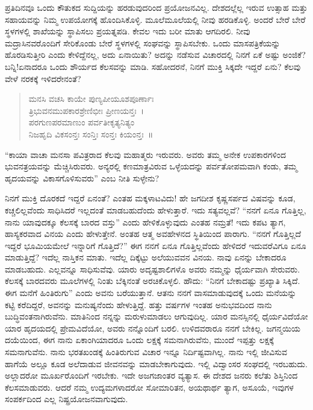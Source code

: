 ಪ್ರತಿದಿನವೂ ಒಂದು ಕೌತುಕದ ಸುದ್ದಿಯನ್ನು ಹರಡುವುದರಿಂದ ಪ್ರಯೋಜನವಿಲ್ಲ. ದೇಶದಲ್ಲೆಲ್ಲ ಇರುವ ಉತ್ಸಾಹ ಮತ್ತು ಸಹಾಯವನ್ನು ನಿಮ್ಮ ಉಪಯೋಗಕ್ಕೆ ಹೊಂದಿಸಿಕೊಳ್ಳಿ. ಮೂಲೆಮೂಲೆಯಲ್ಲಿ ನೀವು ಹರಡಿಕೊಳ್ಳಿ. ಅಂದರೆ ಬೇರೆ ಬೇರೆ ಸ್ಥಳಗಳಲ್ಲಿ ಶಾಖೆಯನ್ನು ಸ್ಥಾಪಿಸಲು ಪ್ರಯತ್ನಪಡಿ. ಕೇವಲ ಇದು ಬರೀ ಮಾತು ಆಗದಿರಲಿ. ನೀವು ಮದ್ರಾಸಿನವರೊಂದಿಗೆ ಸೇರಿಕೊಂಡು ಬೇರೆ ಸ್ಥಳಗಳಲ್ಲಿ ಸಂಘವನ್ನು ಸ್ಥಾಪಿಸಬೇಕು. ಒಂದು ಮಾಸಪತ್ರಿಕೆಯನ್ನು ಹೊರಡಿಸುತ್ತೀರಿ ಎಂದು ಕೇಳಿದ್ದೆನಲ್ಲ, ಅದು ಏನಾಯಿತು? ಅದನ್ನು ನಡೆಸುವ ವಿಚಾರದಲ್ಲಿ ನಿನಗೆ ಏಕೆ ಅಷ್ಟು ಅಂಜಿಕೆ? ಬನ್ನಿ!ಏನಾದರೂ ಒಂದು ಶೌರ್ಯದ ಕೆಲಸವನ್ನು ಮಾಡಿ. ಸಹೋದರನೆ, ನಿನಗೆ ಮುಕ್ತಿ ಸಿಕ್ಕದೇ ಇದ್ದರೆ ಏನು? ಕೆಲವು ವೇಳೆ ನರಕಕ್ಕೆ ಇಳಿದರೇನಂತೆ?
\begin{verse}
 ಮನಸಿ ವಚಸಿ ಕಾಯೇ ಪುಣ್ಯಪೀಯೂಶಪೂರ್ಣಾಃ\\
 ತ್ರಿಭುವನಮುಪಕಾರಶ್ರೇಣಿಭೀಃ ಪ್ರೀಣಯನ್ತಃ~।\\
 ಪರಗುಣಪರಮಾಣುಂ ಪರ್ವತೀಕೃತ್ಯನಿತ್ಯಂ\\
 ನಿಜಹೃದಿ ವಿಕಸಂನ್ತಃ ಸಂನ್ತಿಃ ಸಂನ್ತಃ ಕಿಯಂನ್ತಃ~॥ 
\end{verse}

“ಕಾಯಾ ವಾಚಾ ಮನಸಾ ಪವಿತ್ರರಾದ ಕೆಲವು ಮಹಾತ್ಮರು ಇರುವರು. ಅವರು ತಮ್ಮ ಅನೇಕ ಉಪಕಾರಗಳಿಂದ ಭುವನತ್ರಯವನ್ನು ಮೆಚ್ಚಿಸಿರುವರು. ಅನ್ಯರಲ್ಲಿ ಕಣಮಾತ್ರವಿರುವ ಒಳ್ಳೆಯದನ್ನು ಪರ್ವತೋಪಮವಾಗಿ ಕಂಡು, ತಮ್ಮ ಹೃದಯವನ್ನು ವಿಕಾಸಗೊಳಿಸುವರು” ಎಂಬ ನೀತಿ ಸುಳ್ಳೇನು?

ನಿನಗೆ ಮುಕ್ತಿ ದೊರಕದೆ ಇದ್ದರೆ ಏನಂತೆ? ಎಂತಹ ಮಕ್ಕಳಾಟವಿದು! ಹೇ ಜಗದೀಶ ಕೃಷ್ಣಸರ್ಪದ ವಿಷವನ್ನು ಕೂಡ, ಕಚ್ಚಲಿಲ್ಲವೆಂದು ಸಾಧಿಸಿದರೆ ಇಲ್ಲದಂತೆ ಮಾಡಬಹುದೆಂದು ಹೇಳುತ್ತಾರೆ. ಇದು ಸತ್ಯವಲ್ಲವೆ? “ನನಗೆ ಏನೂ ಗೊತ್ತಿಲ್ಲ, ನಾನು ಯಾವುದಕ್ಕೂ ಕೆಲಸಕ್ಕೆ ಬಾರದ ವಸ್ತು” ಎಂದು ಹೇಳಿಕೊಳ್ಳುವುದು ಎಂತಹ ನಮ್ರತೆ! ಇದು ಕಪಟ ತ್ಯಾಗ, ಹಾಸ್ಯಕರವಾದ ವಿನಯ ಎಂದು ಹೇಳುತ್ತೇನೆ. ಅಂತಹ ಆತ್ಮ ಅವಹೇಳನದ ಸ್ಥಿತಿಯಿಂದ ಪಾರಾಗು. “ನನಗೆ ಗೊತ್ತಿಲ್ಲದೆ ಇದ್ದರೆ ಭೂಮಿಯಮೇಲೆ ಇನ್ನಾರಿಗೆ ಗೊತ್ತಿದೆ?” ಈಗ ನನಗೆ ಏನೂ ಗೊತ್ತಿಲ್ಲವೆಂದು ಹೇಳಿದರೆ ಇದುವರೆವಿಗೂ ಏನೂ ಮಾಡುತ್ತಿದ್ದೆ? ಇದೆಲ್ಲ ನಾಸ್ತಿಕನ ಮಾತು. ಇದೆಲ್ಲ ದಿಕ್ಕೆಟ್ಟು ಅಲೆಯುವವನ ವಿನಯ. ನಾವು ಏನನ್ನು ಬೇಕಾದರೂ ಮಾಡಬಹುದು. ಎಲ್ಲವನ್ನೂ ಸಾಧಿಸುವೆವು. ಯಾರು ಅದೃಷ್ಟಶಾಲಿಗಳೊ ಅವರು ನಮ್ಮನ್ನು ಧೈರ್ಯವಾಗಿ ಸೇರುವರು. ಕೆಲಸಕ್ಕೆ ಬಾರದವರು ಮೂಲೆಗಳಲ್ಲಿ ನಿಂತು ಬೆಕ್ಕಿನಂತೆ ಅರಚಿಕೊಳ್ಳಲಿ. ಹೌದು: “ನಿನಗೆ ಬೇಕಾದಷ್ಟು ಪ್ರಖ್ಯಾತಿ ಸಿಕ್ಕಿದೆ. ಈಗ ಮನೆಗೆ ಹಿಂತಿರುಗು” ಎಂದು ಅವನು ಬರೆಯುತ್ತಾನೆ. ಆತನು ನನಗೆ ವಾಸಮಾಡುವುದಕ್ಕೆ ಒಂದು ಮನೆಯನ್ನು ಕಟ್ಟಿ ಕರೆದಿದ್ದರೆ, ಅವನನ್ನು ಮನುಷ್ಯನೆಂದು ಹೇಳುತ್ತಿದ್ದೆ. ಹತ್ತು ವರ್ಷಗಳ ಇಂತಹ ಅನುಭವದಿಂದ ನಾನು ಬುದ್ಧಿವಂತನಾಗಿರುವೆನು. ಮಾತಿನಿಂದ ನನ್ನನ್ನು ಮರುಳುಮಾಡಲು ಆಗುವುದಿಲ್ಲ. ಯಾರ ಮನಸ್ಸಿನಲ್ಲಿ ಧೈರ್ಯವಿದೆಯೋ ಯಾರ ಹೃದಯದಲ್ಲಿ ಪ್ರೇಮವಿದೆಯೋ, ಅವರು ನನ್ನೊಂದಿಗೆ ಬರಲಿ. ಉಳಿದವರಾರೂ ನನಗೆ ಬೇಕಿಲ್ಲ. ಜಗನ್ಮಯಿಯ ದಯೆಯಿಂದ, ಈಗ ನಾನು ಏಕಾಂಗಿಯಾದರೂ ಒಂದು ಲಕ್ಷಕ್ಕೆ ಸಮನಾಗಿರುವೆನು, ಮುಂದೆ ಇಪ್ಪತ್ತು ಲಕ್ಷಕ್ಕೆ ಸಮನಾಗುವೆನು. ನಾನು ಭರತಖಂಡಕ್ಕೆ ಹಿಂತಿರುಗುವ ವಿಚಾರ ಇನ್ನೂ ನಿರ್ದಿಷ್ಟವಾಗಿಲ್ಲ. ನಾನು ಇಲ್ಲಿ ಜೀವಿಸುವ ಹಾಗೆಯೆ ಅಲ್ಲೂ ಕೂಡ ಅಲೆದಾಡುವ ಜೀವನವನ್ನು ಮಾಡಬೇಕಾಗುವುದು. ಇಲ್ಲಿ ವಿದ್ವಾಂಸರ ಸಂಘದಲ್ಲಿ ಇರಬಹುದು. ಅಲ್ಲಾದರೋ ಮೂರ್ಖರೊಂದಿಗೆ ಇರಬೇಕು. ಇದೇ ಅಜಗಜಾಂತರ ವ್ಯತ್ಯಾಸ. ಈ ದೇಶದ ಜನರು ಕಲೆತು ಶಿಸ್ತಿನಿಂದ ಕೆಲಸಮಾಡುವರು. ಆದರೆ ನಮ್ಮ ಉದ್ಯಮಗಳಾದರೋ ಸೋಮಾರಿತನ, ಅಯಥಾರ್ಥ ತ್ಯಾಗ, ಅಸೂಯೆ, ಇವುಗಳ ಸಂಪರ್ಕದಿಂದ ಎಲ್ಲ ನಿಷ್ಪ್ರಯೋಜನವಾಗುವುದು.
\vspace{0.1cm}


